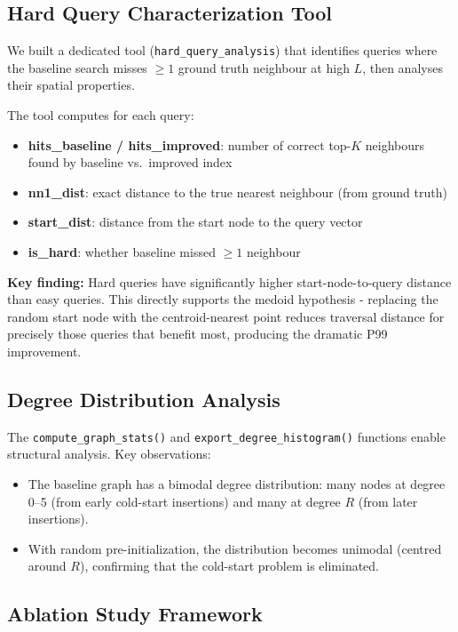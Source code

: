 \documentclass[10pt]{article}
\begin{document}
\subsection{Hard Query Characterization Tool}

We built a dedicated tool (\texttt{hard\_query\_analysis}) that identifies queries where the baseline search misses $\geq 1$ ground truth neighbour at high $L$, then analyses their spatial properties.

The tool computes for each query:
\begin{itemize}
    \item \textbf{hits\_baseline / hits\_improved}: number of correct top-$K$ neighbours found by baseline vs.\ improved index
    \item \textbf{nn1\_dist}: exact distance to the true nearest neighbour (from ground truth)
    \item \textbf{start\_dist}: distance from the start node to the query vector
    \item \textbf{is\_hard}: whether baseline missed $\geq 1$ neighbour
\end{itemize}

\textbf{Key finding:} Hard queries have significantly higher start-node-to-query distance than easy queries. This directly supports the medoid hypothesis - replacing the random start node with the centroid-nearest point reduces traversal distance for precisely those queries that benefit most, producing the dramatic P99 improvement.

\subsection{Degree Distribution Analysis}

The \texttt{compute\_graph\_stats()} and \texttt{export\_degree\_histogram()} functions enable structural analysis. Key observations:
\begin{itemize}
    \item The baseline graph has a bimodal degree distribution: many nodes at degree 0--5 (from early cold-start insertions) and many at degree $R$ (from later insertions).
    \item With random pre-initialization, the distribution becomes unimodal (centred around $R$), confirming that the cold-start problem is eliminated.
\end{itemize}

\subsection{Ablation Study Framework}
\end{document}
